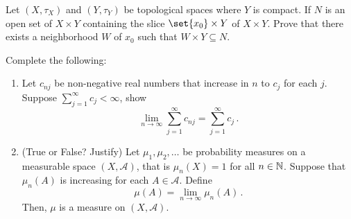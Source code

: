 \documentclass[12pt]{amsart}
\begin{document}
\begin{question}[20 points]
	Let $(X, \tau_X)$ and $(Y, \tau_Y)$ be topological spaces where $Y$ is compact.
	If $N$ is an open set of $X\times Y$ containing the slice $\set{x_0} \times Y$ of $X \times Y$.
	Prove that there exists a neighborhood $W$ of $x_0$ such that $W\times Y \subseteq N$.
\end{question}

\begin{question}[20 points] Complete the following:
	\begin{enumerate}
		\item Let $c_{nj}$ be non-negative real numbers that increase in $n$ to $c_j$ for each $j$.
		      Suppose $\sum_{j=1}^\infty c_j < \infty$, show
		      \begin{equation*}
			      \lim_{n\to \infty} \sum_{j=1}^\infty c_{nj} = \sum_{j=1}^\infty c_j \,.
		      \end{equation*}

		\item (True or False? Justify)
		      Let $\mu_1, \mu_2, \dots$ be probability measures
		      on a measurable space $(X, \mathcal{A})$, that is $\mu_n (X) = 1$ for all $n \in \mathbb{N}$.
		      Suppose that $\mu_n (A)$ is increasing for each $A \in \mathcal{A}$.
		      Define
		      \begin{equation*}
			      \mu(A) = \lim_{n\to \infty} \mu_n(A) \,.
		      \end{equation*}
		      Then, $\mu$ is a measure on $(X, \mathcal{A})$.
	\end{enumerate}
\end{question}
\end{document}
